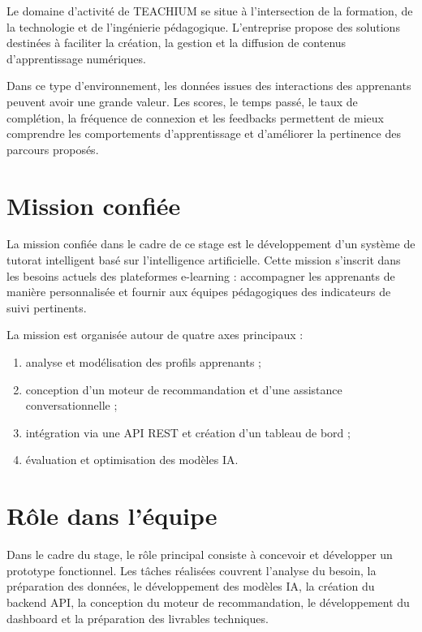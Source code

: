 \documentclass[12pt,a4paper]{report}
\begin{document}
Le domaine d'activité de TEACHIUM se situe à l'intersection de la formation, de la technologie et de l'ingénierie pédagogique. L'entreprise propose des solutions destinées à faciliter la création, la gestion et la diffusion de contenus d'apprentissage numériques.

Dans ce type d'environnement, les données issues des interactions des apprenants peuvent avoir une grande valeur. Les scores, le temps passé, le taux de complétion, la fréquence de connexion et les feedbacks permettent de mieux comprendre les comportements d'apprentissage et d'améliorer la pertinence des parcours proposés.

\section{Mission confiée}

La mission confiée dans le cadre de ce stage est le développement d'un système de tutorat intelligent basé sur l'intelligence artificielle. Cette mission s'inscrit dans les besoins actuels des plateformes e-learning : accompagner les apprenants de manière personnalisée et fournir aux équipes pédagogiques des indicateurs de suivi pertinents.

La mission est organisée autour de quatre axes principaux :

\begin{enumerate}
    \item analyse et modélisation des profils apprenants ;
    \item conception d'un moteur de recommandation et d'une assistance conversationnelle ;
    \item intégration via une API REST et création d'un tableau de bord ;
    \item évaluation et optimisation des modèles IA.
\end{enumerate}

\section{Rôle dans l'équipe}

Dans le cadre du stage, le rôle principal consiste à concevoir et développer un prototype fonctionnel. Les tâches réalisées couvrent l'analyse du besoin, la préparation des données, le développement des modèles IA, la création du backend API, la conception du moteur de recommandation, le développement du dashboard et la préparation des livrables techniques.
\end{document}
